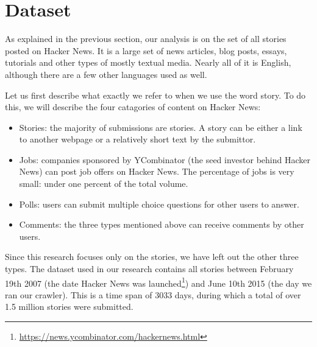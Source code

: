 \section{Dataset}
\label{sec:dataset}
As explained in the previous section, our analysis is on the set of all stories posted on Hacker News. It is a large set of news articles, blog posts, essays, tutorials and other types of mostly textual media. Nearly all of it is English, although there are a few other languages used as well.

Let us first describe what exactly we refer to when we use the word story. To do this, we will describe the four catagories of content on Hacker News:
\begin{itemize}
\item Stories: the majority of submissions are stories. A story can be either a link to another webpage or a relatively short text by the submittor.
\item Jobs: companies sponsored by YCombinator (the seed investor behind Hacker News) can post job offers on Hacker News. The percentage of jobs is very small: under one percent of the total volume.
\item Polls: users can submit multiple choice questions for other users to answer.
\item Comments: the three types mentioned above can receive comments by other users.
\end{itemize}

Since this research focuses only on the stories, we have left out the other three types. The dataset used in our research contains all stories between February 19th 2007 (the date Hacker News was launched\footnote{\url{https://news.ycombinator.com/hackernews.html}}) and June 10th 2015 (the day we ran our crawler). This is a time span of 3033 days, during which a total of over 1.5 million stories were submitted.

